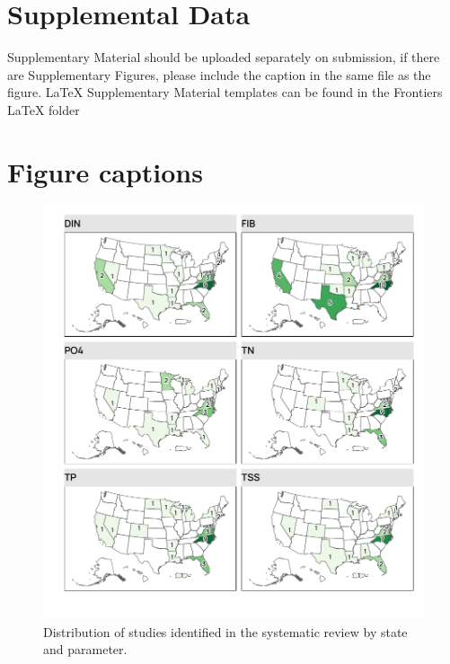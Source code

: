 \documentclass[utf8]{FrontiersinHarvard}
\begin{document}
\hypertarget{supplemental-data}{%
\section*{Supplemental Data}\label{supplemental-data}}

Supplementary Material should be uploaded separately on submission, if
there are Supplementary Figures, please include the caption in the same
file as the figure. LaTeX Supplementary Material templates can be found
in the Frontiers LaTeX folder




\hypertarget{figure-captions}{%
\section*{Figure captions}\label{figure-captions}}

\begin{figure}[H]
\includegraphics[width=1\linewidth,]{../figures/study_map} \caption{Distribution of studies identified in the systematic review by state and parameter.}\label{fig:studymap}
\end{figure}
\end{document}
